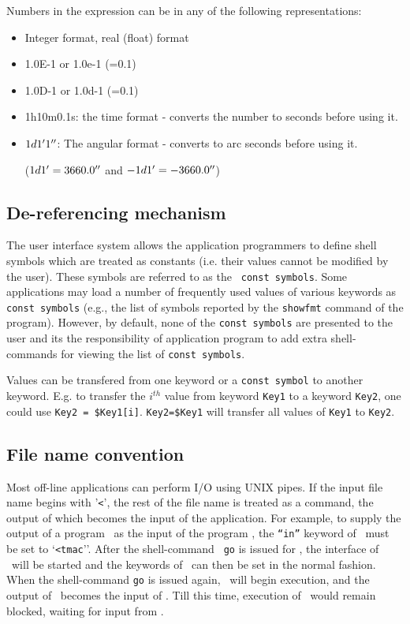 \documentclass[11pt]{article}
\begin{document}
Numbers in the expression can be in any of the following
representations:

\begin{itemize}
\item Integer format, real (float) format

\item 1.0E-1 or 1.0e-1 (=0.1)
        
\item 1.0D-1 or 1.0d-1 (=0.1)
        
\item 1h10m0.1s: the time format - converts the number to seconds
before using it.
\item $1d1{^\prime}1{^{\prime\prime}}$: The angular format - converts to arc
seconds before using it.

($1d1{^\prime} = 3660.0{^{\prime\prime}}$ and $-1d1{^\prime} = -3660.0{^{\prime\prime}}$)
\end{itemize}


\subsection{De-referencing mechanism}
\label{DOLLOR_MECH} 

The user interface system allows the application programmers to define
shell symbols which are treated as constants (i.e. their values cannot
be modified by the user).  These symbols are referred to as the {\tt
  const symbols}.  Some applications may load a number of frequently
used values of various keywords as {\tt const symbols} (e.g.,
the list of symbols reported by the {\tt showfmt} command of the
 program).  However,
by default, none of the {\tt const symbols} are presented to the user
and its the responsibility of application program to add extra
shell-commands for viewing the list of {\tt const symbols}.

Values can be transfered from one keyword or a {\tt const symbol} to
another keyword.  E.g. to transfer the $i^{th}$ value from keyword
{\tt Key1} to a keyword {\tt Key2}, one could use {\tt Key2 =
\$Key1[i]}.  {\tt Key2=\$Key1} will transfer all values of {\tt Key1}
to {\tt Key2}.


\subsection{File name convention}

Most off-line applications can perform I/O using UNIX pipes.  If the
input file name begins with '{\tt <}', the rest of the file name is
treated as a command, the output of which becomes the input of the
application. For example, to supply the output of a program \tmac\ as
the input of the program \xtract, the {\tt ``{\tt in}''} keyword of
\xtract\ must be set to `{\tt <tmac}''.  After the shell-command {\tt
go} is issued for \xtract, the interface of \tmac\ will be started and
the keywords of \tmac\ can then be set in the normal fashion.  When
the shell-command {\tt go} is issued again, \tmac\ will begin
execution, and the output of \tmac\ becomes the input of \xtract.
Till this time, execution of \xtract\ would remain blocked, waiting
for input from \tmac.
\end{document}

